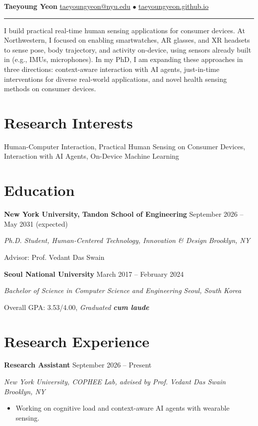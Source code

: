 \documentclass[11pt,letterpaper]{article}
\newcommand{\entry}[4]{%
\textbf{#1} \hfill #2\par
\textit{#3} \hfill \textit{#4}\par
}
\newcommand{\entrygap}{\vspace{8pt}}
\begin{document}
{\Large\textbf{Taeyoung Yeon}}
\href{mailto:taeyoungyeon@nyu.edu}{taeyoungyeon@nyu.edu} $\bullet$ \href{https://taeyoungyeon.github.io}{taeyoungyeon.github.io}

\vspace{4pt}
\hrule
\vspace{8pt}

I build practical real-time human sensing applications for consumer devices. At Northwestern, I focused on enabling smartwatches, AR glasses, and XR headsets to sense pose, body trajectory, and activity on-device, using sensors already built in (e.g., IMUs, microphones). In my PhD, I am expanding these approaches in three directions: context-aware interaction with AI agents, just-in-time interventions for diverse real-world applications, and novel health sensing methods on consumer devices.

\section{Research Interests}
Human-Computer Interaction, Practical Human Sensing on Consumer Devices, Interaction with AI Agents, On-Device Machine Learning

\section{Education}
\entry{New York University, Tandon School of Engineering}{September 2026 -- May 2031 (expected)}{Ph.D. Student, Human-Centered Technology, Innovation \& Design}{Brooklyn, NY}
Advisor: Prof. Vedant Das Swain

\entrygap

\entry{Seoul National University}{March 2017 -- February 2024}{Bachelor of Science in Computer Science and Engineering}{Seoul, South Korea}
Overall GPA: 3.53/4.00, \textit{Graduated \textbf{cum laude}}

\section{Research Experience}
\entry{Research Assistant}{September 2026 -- Present}{New York University, COPHEE Lab, advised by Prof. Vedant Das Swain}{Brooklyn, NY}
\begin{itemize}[leftmargin=1.5em,nosep,topsep=3pt]
\item Working on cognitive load and context-aware AI agents with wearable sensing.
\end{itemize}
\end{document}

